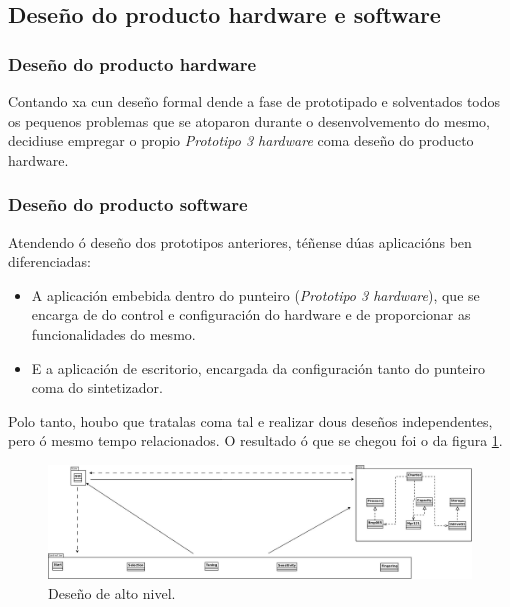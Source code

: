  \subsection{Deseño do producto hardware e software}

  \subsubsection{Deseño do producto hardware}

  Contando xa cun deseño formal dende a fase de prototipado e solventados todos
  os pequenos problemas que se atoparon durante o desenvolvemento do mesmo,
  decidiuse empregar o propio \textit{Prototipo 3 hardware} coma deseño do
  producto hardware.

  \subsubsection{Deseño do producto software}

  Atendendo ó deseño dos prototipos anteriores, téñense dúas aplicacións ben
  diferenciadas:

  \begin{itemize}
   \item A aplicación embebida dentro do punteiro
         (\textit{Prototipo 3 hardware}), que se encarga de do control e
         configuración do hardware e de proporcionar as funcionalidades do
         mesmo.
   \item E a aplicación de escritorio, encargada da configuración tanto do
         punteiro coma do sintetizador.
  \end{itemize}

  Polo tanto, houbo que tratalas coma tal e realizar dous deseños
  independentes, pero ó mesmo tempo relacionados. O resultado ó que se chegou
  foi o da figura \ref{figura:DesenoAltoNivel}.

  \begin{figure}[htbp]
   \centering
   \includegraphics[scale=0.35,angle=90,keepaspectratio=true]{./imagenes/desenho-an.png}
   \caption{Deseño de alto nivel.}
   \label{figura:DesenoAltoNivel}
  \end{figure}


